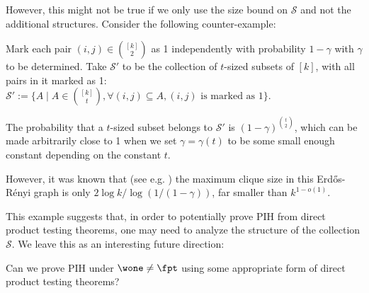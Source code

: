 However, this might not be true if we only use the size bound on $\mathcal S$ and not the additional structures. Consider the following counter-example:

\begin{example}
    Mark each pair $(i,j) \in \binom{[k]}{2}$ as 1 independently with probability $1-\gamma$ with $\gamma$ to be determined. Take $\mathcal S'$ to be the collection of $t$-sized subsets of $[k]$, with all pairs in it marked as 1: $\mathcal S':=\{A \mid A \in \binom{[k]}{t}, \forall (i,j) \subseteq A, (i,j)\text{ is marked as 1}\}$.

    The probability that a $t$-sized subset belongs to $\mathcal S'$ is $(1-\gamma)^{\binom{t}{2}}$, which can be made arbitrarily close to 1 when we set $\gamma=\gamma(t)$ to be some small enough constant depending on the constant $t$.

    However, it was known that (see e.g. \cite{Grimmett_McDiarmid_1975}) the maximum clique size in this Erd\H{o}s-R\'enyi graph is only $2 \log k/\log (1/(1-\gamma))$, far smaller than $k^{1-o(1)}$.
\end{example}

This example suggests that, in order to potentially prove PIH from direct product testing theorems, one may need to analyze the structure of the collection $\mathcal S$. We leave this as an interesting future direction:

\begin{question}
    Can we prove PIH under $\wone \ne \fpt$ using some appropriate form of direct product testing theorems?
\end{question}